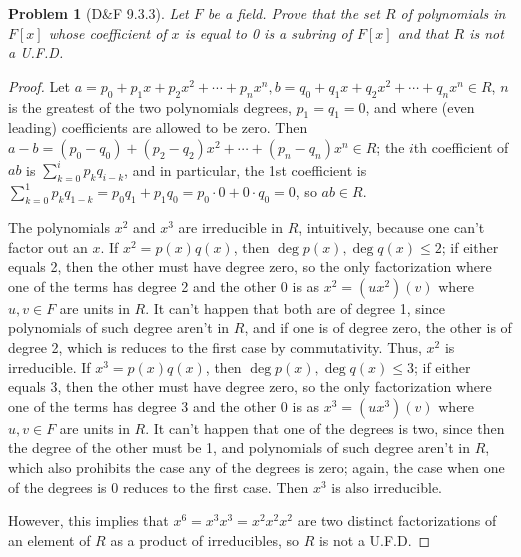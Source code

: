\documentclass{article}
\newtheorem{plm}{Problem}
\begin{document}
\begin{plm}[D\&F 9.3.3]
  Let $F$ be a field.
  Prove that the set $R$ of polynomials in $F[x]$  whose coefficient of $x$ is equal to 0 is a subring of $F[x]$ and that $R$ is not a U.F.D.
\end{plm}

\begin{proof}
  Let $a = p_{0} + p_{1}x + p_{2}x^{2} + \cdots + p_{n}x^{n}, b = q_{0} + q_{1}x + q_{2}x^{2} + \cdots + q_{n}x^{n} \in R$,
  $n$ is the greatest of the two polynomials degrees, $p_{1} = q_{1} = 0$, and where (even leading) coefficients are allowed to be zero.
  Then $a - b = (p_{0} - q_{0}) + (p_{2} - q_{2})x^{2} + \cdots + (p_{n} - q_{n})x^{n} \in R$; the $i$th coefficient of $ab$ is
  $\sum_{k = 0}^{i}p_{k}q_{i - k}$, and in particular, the 1st coefficient is $\sum_{k = 0}^{1}p_{k}q_{1 - k} = p_{0}q_{1} + p_{1}q_{0}
  = p_{0} \cdot 0 + 0 \cdot q_{0} = 0$, so $ab \in R$.

  The polynomials $x^{2}$ and $x^{3}$ are irreducible in $R$, intuitively, because one can't factor out an $x$.
  If $x^{2} = p(x)q(x)$, then $\deg p(x), \deg q(x) \leq 2$; if either equals 2, then the other must have degree zero,
  so the only factorization where one of the terms has degree 2 and the other 0 is as $x^{2} = (ux^{2})(v)$ where $u, v \in F$ are units in $R$.
  It can't happen that both are of degree 1, since polynomials of such degree aren't in $R$,
  and if one is of degree zero, the other is of degree 2, which is reduces to the first case by commutativity.
  Thus, $x^{2}$ is irreducible.
  If $x^{3} = p(x)q(x)$, then $\deg p(x), \deg q(x) \leq 3$; if either equals 3, then the other must have degree zero,
  so the only factorization where one of the terms has degree 3 and the other 0 is as $x^{3} = (ux^{3})(v)$ where $u, v \in F$ are units in $R$.
  It can't happen that one of the degrees is two, since then the degree of the other must be 1,
  and polynomials of such degree aren't in $R$, which also prohibits the case any of the degrees is zero;
  again, the case when one of the degrees is 0 reduces to the first case.
  Then $x^{3}$ is also irreducible.

  However, this implies that $x^{6} = x^{3}x^{3} = x^{2}x^{2}x^2$ are two distinct factorizations of an element of $R$ as a product of irreducibles,
  so $R$ is not a U.F.D.
\end{proof}
\end{document}
